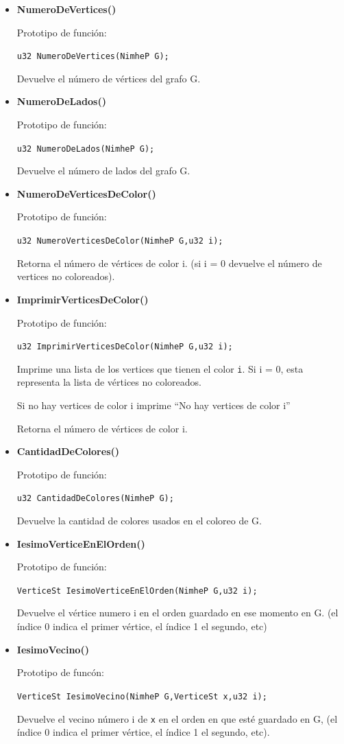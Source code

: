\documentclass[11pt,a4paper]{article}
\theoremstyle{plain}
\begin{document}
\begin{itemize}
\item{\textbf{{NumeroDeVertices()}}}

Prototipo de función:

\texttt{u32 NumeroDeVertices(NimheP G);}

Devuelve el número de vértices del grafo G.

\item{\textbf{{NumeroDeLados()}}}

Prototipo de función:

\texttt{u32 NumeroDeLados(NimheP G);}

Devuelve el número de lados del grafo G.

\item{\textbf{{NumeroDeVerticesDeColor()}}}

Prototipo de función:

\texttt{u32 NumeroVerticesDeColor(NimheP G,u32 i);}

Retorna el número de vértices de color i. (si i = 0 devuelve el número de vertices no coloreados).

\item\textbf{ImprimirVerticesDeColor()}

Prototipo de función:

\texttt{u32 ImprimirVerticesDeColor(NimheP G,u32 i);}

Imprime una lista de los vertices que tienen el color \texttt{i}. Si i = 0, esta representa la lista de vértices no coloreados.

Si no hay vertices de color i imprime “No hay vertices de color i”

Retorna el número de vértices de color i.

\item\textbf{CantidadDeColores()}

Prototipo de función:

\texttt{u32 CantidadDeColores(NimheP G);}

Devuelve la cantidad de colores usados en el coloreo de G.

\item\textbf{IesimoVerticeEnElOrden()}

Prototipo de función:

\texttt{VerticeSt IesimoVerticeEnElOrden(NimheP G,u32 i);}

 Devuelve el vértice numero i en el orden guardado en ese momento en G. (el índice 0 indica el primer vértice, el índice 1 el segundo, etc)

\item\textbf{IesimoVecino()}

Prototipo de funcón:

\texttt{VerticeSt IesimoVecino(NimheP G,VerticeSt x,u32 i);}

Devuelve el vecino número i de \texttt{x} en el orden en que esté guardado en G, (el índice 0 indica el primer vértice, el índice 1 el segundo, etc).

\end{itemize}
\end{document}
